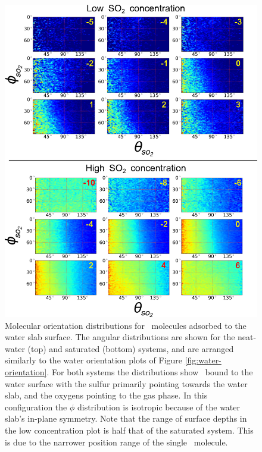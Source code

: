 \documentclass{article}
\begin{document}

\begin{figure}[h!]
	\begin{center}
		\includegraphics[scale=1.0]{theta-phi-so2.png}
		\caption{Molecular orientation distributions for \suldiox~molecules adsorbed to the water slab surface. The angular distributions are shown for the neat-water (top) and saturated (bottom) systems, and are arranged similarly to the water orientation plots of Figure \ref{fig:water-orientation}. For both systems the distributions show \suldiox~bound to the water surface with the sulfur primarily pointing towards the water slab, and the oxygens pointing to the gas phase. In this configuration the $\phi$ distribution is isotropic because of the water slab's in-plane symmetry. Note that the range of surface depths in the low concentration plot is half that of the saturated system. This is due to the narrower position range of the single \suldiox~molecule.}
		\label{fig:so2-orientation}
	\end{center}
\end{figure}
\end{document}
